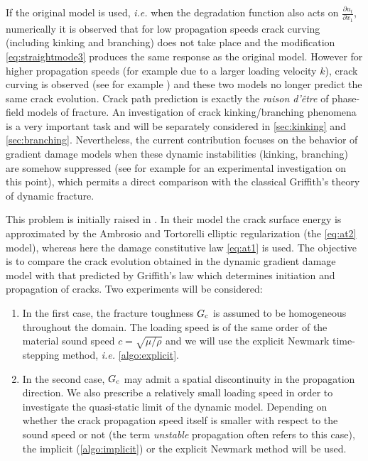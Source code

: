 \begin{remark}
If the original model is used, \emph{i.e.} when the degradation function also acts on $\frac{\partial u_t}{\partial x_1}$, numerically it is observed that for low propagation speeds crack curving (including kinking and branching) does not take place and the modification \eqref {eq:straightmode3} produces the same response as the original model. However for higher propagation speeds (for example due to a larger loading velocity $k$), crack curving is observed (see for example \cite{Bourdin:2011}) and these two models no longer predict the same crack evolution. Crack path prediction is exactly the \emph{raison d'être} of phase-field models of fracture. An investigation of crack kinking/branching phenomena is a very important task and will be separately considered in \cref{sec:kinking} and \cref{sec:branching}. Nevertheless, the current contribution focuses on the behavior of gradient damage models when these dynamic instabilities (kinking, branching) are somehow suppressed (see for example \cite{LivneBen-DavidFineberg:2007} for an experimental investigation on this point), which permits a direct comparison with the classical Griffith's theory of dynamic fracture.
\end{remark}

This problem is initially raised in \cite{Bourdin:2011}. In their model the crack surface energy is approximated by the Ambrosio and Tortorelli elliptic regularization (the \eqref{eq:at2} model), whereas here the damage constitutive law \eqref{eq:at1} is used. The objective is to compare the crack evolution obtained in the dynamic gradient damage model with that predicted by Griffith's law which determines initiation and propagation of cracks. Two experiments will be considered:
\begin{enumerate}
\item In the first case, the fracture toughness $G_\mathrm{c}$ is assumed to be homogeneous throughout the domain. The loading speed is of the same order of the material sound speed $c=\sqrt{\mu/\rho}$ and we will use the explicit Newmark time-stepping method, \emph{i.e.} \cref{algo:explicit}.

\item In the second case, $G_\mathrm{c}$ may admit a spatial discontinuity in the propagation direction. We also prescribe a relatively small loading speed in order to investigate the quasi-static limit of the dynamic model. Depending on whether the crack propagation speed itself is smaller with respect to the sound speed or not (the term \emph{unstable} propagation often refers to this case), the implicit (\cref{algo:implicit}) or the explicit Newmark method will be used.
\end{enumerate}

